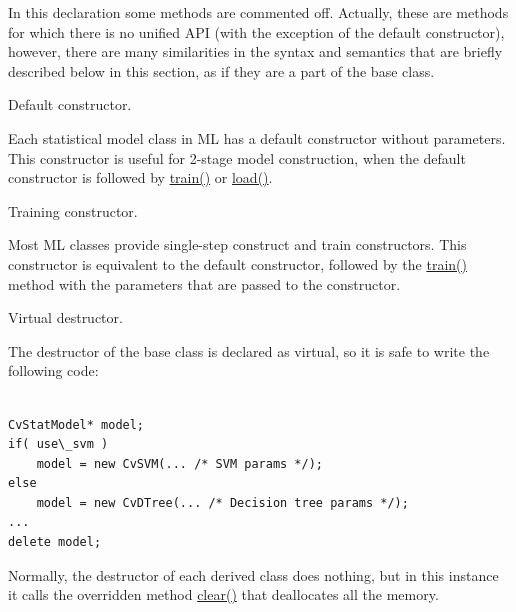 In this declaration some methods are commented off. Actually, these are methods for which there is no unified API (with the exception of the default constructor), however, there are many similarities in the syntax and semantics that are briefly described below in this section, as if they are a part of the base class.



Default constructor.


Each statistical model class in ML has a default constructor without parameters. This constructor is useful for 2-stage model construction, when the default constructor is followed by \href{#CvStatModel.3A.3Atrain}{train()} or \href{#CvStatModel.3A.3Aload}{load()}.



Training constructor.


Most ML classes provide single-step construct and train constructors. This constructor is equivalent to the default constructor, followed by the \href{#CvStatModel.3A.3Atrain}{train()} method with the parameters that are passed to the constructor.



Virtual destructor.


The destructor of the base class is declared as virtual, so it is safe to write the following code:

\begin{lstlisting}

CvStatModel* model;
if( use\_svm )
    model = new CvSVM(... /* SVM params */);
else
    model = new CvDTree(... /* Decision tree params */);
...
delete model;

\end{lstlisting}

Normally, the destructor of each derived class does nothing, but in this instance it calls the overridden method \href{#CvStatModel.3A.3Aclear}{clear()} that deallocates all the memory.


